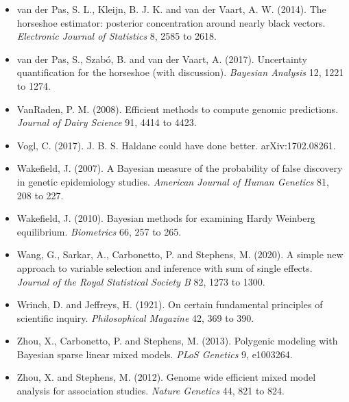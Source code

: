 \begin{itemize}
for estimating and testing effects in genomic studies with multiple conditions.
\emph{Nature Genetics} 51, 187 to 195.
\item van der Pas, S. L., Kleijn, B. J. K. and van der Vaart, A. W. (2014). The horseshoe
estimator: posterior concentration around nearly black vectors. \emph{Electronic Journal of
Statistics} 8, 2585 to 2618.
\item van der Pas, S., Szab\'o, B. and van der Vaart, A. (2017). Uncertainty quantification for the
horseshoe (with discussion). \emph{Bayesian Analysis} 12, 1221 to 1274.
\item VanRaden, P. M. (2008). Efficient methods to compute genomic predictions.
\emph{Journal of Dairy Science} 91, 4414 to 4423.
\item Vogl, C. (2017). J. B. S. Haldane could have done better. arXiv:1702.08261.
\item Wakefield, J. (2007). A Bayesian measure of the probability of false discovery in genetic
epidemiology studies. \emph{American Journal of Human Genetics} 81, 208 to 227.
\item Wakefield, J. (2010). Bayesian methods for examining Hardy Weinberg equilibrium.
\emph{Biometrics} 66, 257 to 265.
\item Wang, G., Sarkar, A., Carbonetto, P. and Stephens, M. (2020). A simple new approach to
variable selection and inference with sum of single effects. \emph{Journal of the Royal Statistical
Society B} 82, 1273 to 1300.
\item Wrinch, D. and Jeffreys, H. (1921). On certain fundamental principles of scientific inquiry.
\emph{Philosophical Magazine} 42, 369 to 390.
\item Zhou, X., Carbonetto, P. and Stephens, M. (2013). Polygenic modeling with Bayesian sparse
linear mixed models. \emph{PLoS Genetics} 9, e1003264.
\item Zhou, X. and Stephens, M. (2012). Genome wide efficient mixed model analysis for association
studies. \emph{Nature Genetics} 44, 821 to 824.
\end{itemize}
